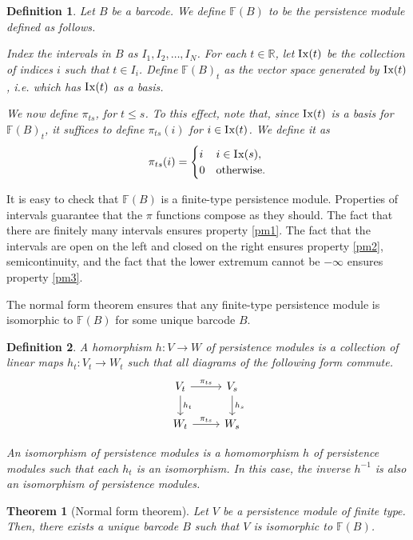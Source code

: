 \documentclass{article}
\newtheorem{theorem}{Theorem}
\newtheorem{definition}{Definition}
\theoremstyle{nonumberplain}
\newcommand{\R}{\mathbb{R}}
\newcommand{\FF}{\mathbb{F}}
\newcommand{\Ix}{\mathop{\mathrm{I\mkern0.7mu x}}}
\begin{document}
\begin{definition}
Let $B$ be a barcode. We define $\FF(B)$ to be the persistence module defined as follows.

Index the intervals in $B$ as $I_1, I_2, \dots, I_N$. For each $t \in \R$, let $\Ix(t)$ be the collection of indices $i$ such that $t \in I_i$. Define $\FF(B)_t$ as the vector space generated by $\Ix(t)$, i.e. which has $\Ix(t)$ as a basis.

We now define $\pi_{ts}$, for $t \leq s$. To this effect, note that, since $\Ix(t)$ is a basis for $\FF(B)_t$, it suffices to define $\pi_{ts}(i)$ for $i \in \Ix(t)$. We define it as
\[\pi_{ts}(i) = \begin{cases} i & i \in \Ix(s),\\ 0 & \text{otherwise}. \end{cases}\]
\end{definition}

It is easy to check that $\FF(B)$ is a finite-type persistence module. Properties of intervals guarantee that the $\pi$ functions compose as they should. The fact that there are finitely many intervals ensures property \ref{pm1}. The fact that the intervals are open on the left and closed on the right ensures property \ref{pm2}, semicontinuity, and the fact that the lower extremum cannot be $-\infty$ ensures property \ref{pm3}.

The normal form theorem ensures that any finite-type persistence module is isomorphic to $\FF(B)$ for some unique barcode $B$.

\begin{definition}
A homorphism $h \colon V \to W$ of persistence modules is a collection of linear maps $h_t \colon V_t \to W_t$ such that all diagrams of the following form commute.
\[
\begin{tikzcd}
V_t \arrow[d, "h_t"] \arrow[r, "\pi_{ts}"] & V_s \arrow[d, "h_s"] \\
W_t \arrow[r, "\pi_{ts}"]                  & W_s                 
\end{tikzcd}
\]

An isomorphism of persistence modules is a homomorphism $h$ of persistence modules such that each $h_t$ is an isomorphism. In this case, the inverse $h^{-1}$ is also an isomorphism of persistence modules.
\end{definition}

\begin{theorem}[Normal form theorem]
Let $V$ be a persistence module of finite type. Then, there exists a unique barcode $B$ such that $V$ is isomorphic to $\FF(B)$.
\end{theorem}
\end{document}
